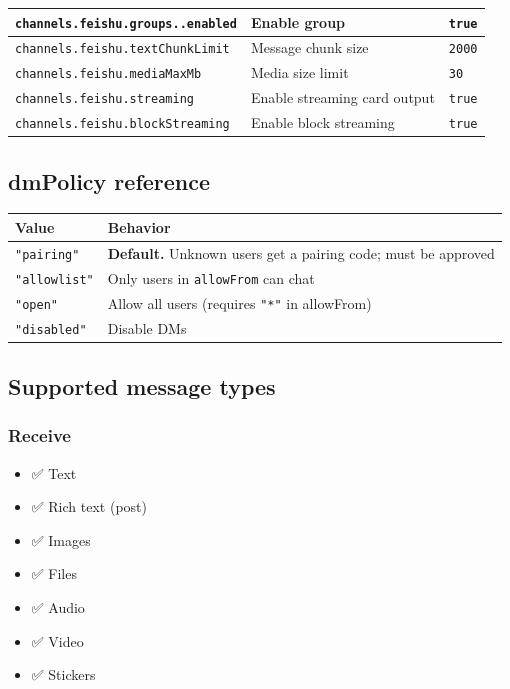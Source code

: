 \begin{table}[h]
\begin{tabular}{|l|l|l|}
\hline
\texttt{channels.feishu.groups..enabled} & Enable group & \texttt{true} \\
\hline
\texttt{channels.feishu.textChunkLimit} & Message chunk size & \texttt{2000} \\
\hline
\texttt{channels.feishu.mediaMaxMb} & Media size limit & \texttt{30} \\
\hline
\texttt{channels.feishu.streaming} & Enable streaming card output & \texttt{true} \\
\hline
\texttt{channels.feishu.blockStreaming} & Enable block streaming & \texttt{true} \\
\hline
\end{tabular}
\end{table}



\hrulefill


\subsection{dmPolicy reference}



\begin{table}[h]
\centering
\small
\begin{tabular}{|l|l|}
\hline
Value & Behavior \\
\hline
\texttt{"pairing"} & \textbf{Default.} Unknown users get a pairing code; must be approved \\
\hline
\texttt{"allowlist"} & Only users in \texttt{allowFrom} can chat \\
\hline
\texttt{"open"} & Allow all users (requires \texttt{"*"} in allowFrom) \\
\hline
\texttt{"disabled"} & Disable DMs \\
\hline
\end{tabular}
\end{table}



\hrulefill


\subsection{Supported message types}


\subsubsection{Receive}


\begin{itemize}
  \item ✅ Text
  \item ✅ Rich text (post)
  \item ✅ Images
  \item ✅ Files
  \item ✅ Audio
  \item ✅ Video
  \item ✅ Stickers
\end{itemize}


